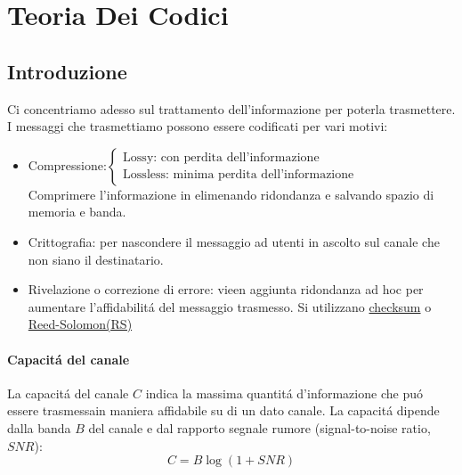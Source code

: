 \section{Teoria Dei Codici}
    \subsection{Introduzione}
        Ci concentriamo adesso sul trattamento dell'informazione per poterla trasmettere.
        I messaggi che trasmettiamo possono essere codificati per vari motivi:
        \begin{itemize}
            \item {
                    Compressione:$\begin{cases}
                        \text{Lossy: con perdita dell'informazione} \nonumber\\
                        \text{Lossless: minima perdita dell'informazione} \nonumber
                    \end{cases}$\\
                    Comprimere l'informazione in elimenando ridondanza e salvando spazio di memoria e banda.
                    
                }
            \item {
                    Crittografia: per nascondere il messaggio ad utenti in ascolto sul canale che non siano il destinatario.
            }
            \item {
                    Rivelazione o correzione di errore: vieen aggiunta ridondanza ad hoc per aumentare l'affidabilitá del messaggio trasmesso. 
                    Si utilizzano \href{https://en.wikipedia.org/wiki/Checksum}{checksum} o \href{https://en.wikipedia.org/wiki/Reed-Solomon_error_correction}{Reed-Solomon(RS)}
            }
        \end{itemize}
        \paragraph{Capacitá del canale}\label{Capacita del canale}
            La capacitá del canale $C$ indica la massima quantitá d'informazione che puó essere trasmessain maniera affidabile su di un dato canale.
            La capacitá dipende dalla banda $B$ del canale e dal rapporto segnale rumore (signal-to-noise ratio,\href{https://en.wikipedia.org/wiki/Signal-to-noise_ratio}{$SNR$}):
            \[
                C = B\log(1 + SNR)  
            \] 
